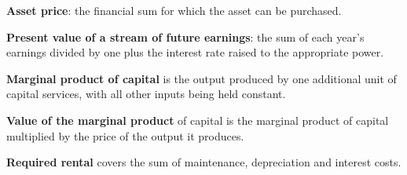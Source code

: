 \begin{keyterms}
\textbf{Asset price}: the financial sum for which the asset can be purchased.

\textbf{Present value of a stream of future earnings}: the sum of each year's earnings divided by one plus the interest rate raised to the appropriate power.

\textbf{Marginal product of capital} is the output produced by one additional unit of capital services, with all other inputs being held constant.

\textbf{Value of the marginal product} of capital is the marginal product of capital multiplied by the price of the output it produces.

\textbf{Required rental} covers the sum of maintenance, depreciation and interest costs.
\end{keyterms}